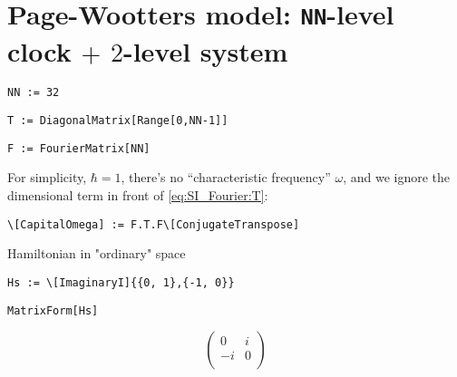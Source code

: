 \section{Page-Wootters model: \texttt{NN}-level clock $+$ $2$-level system}

\begin{lstlisting}
NN := 32
\end{lstlisting}

\begin{lstlisting}
T := DiagonalMatrix[Range[0,NN-1]]
\end{lstlisting}

\begin{lstlisting}
F := FourierMatrix[NN]
\end{lstlisting}

For simplicity, $\hbar = 1$, there's no ``characteristic frequency'' $\omega$,
and we ignore the dimensional term in front of \eqref{eq:SI_Fourier:T}:

\begin{lstlisting}
\[CapitalOmega] := F.T.F\[ConjugateTranspose] 
\end{lstlisting}

Hamiltonian in "ordinary" space
\begin{lstlisting}
Hs := \[ImaginaryI]{{0, 1},{-1, 0}}
\end{lstlisting}
\begin{lstlisting}
MatrixForm[Hs]
\end{lstlisting}
\[
  \left(
    \begin{array}{cc}
     0 & i \\
     -i & 0 \\
    \end{array}
    \right)
\]

